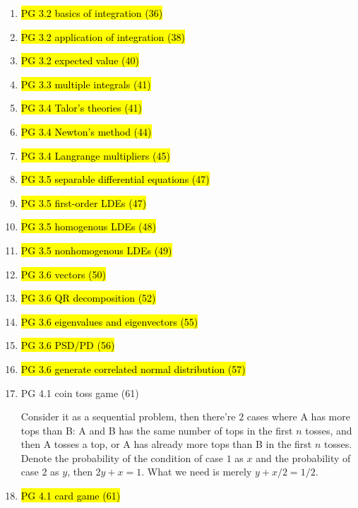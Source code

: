 \documentclass[11pt]{article}
\newenvironment{note}{\begin{enumerate}[leftmargin=1em,topsep=0pt,noitemsep]}{\end{enumerate}}
\newcommand{\solution}{\boxed{\textbf{SOLUTION}}\hspace{.5em}}
\begin{document}
\begin{spacing}{1.1}
\begin{note}
\item \hl{PG 3.2 basics of integration (36)}

\item \hl{PG 3.2 application of integration (38)}

\item \hl{PG 3.2 expected value (40)}

\item \hl{PG 3.3 multiple integrals (41)}

\item \hl{PG 3.4 Talor's theories (41)}

\item \hl{PG 3.4 Newton's method (44)}

\item \hl{PG 3.4 Langrange multipliers (45)}

\item \hl{PG 3.5 separable differential equations (47)}

\item \hl{PG 3.5 first-order LDEs (47)}

\item \hl{PG 3.5 homogenous LDEs (48)}

\item \hl{PG 3.5 nonhomogenous LDEs (49)}

\item \hl{PG 3.6 vectors (50)}

\item \hl{PG 3.6 QR decomposition (52)}

\item \hl{PG 3.6 eigenvalues and eigenvectors (55)}

\item \hl{PG 3.6 PSD/PD (56)}

\item \hl{PG 3.6 generate correlated normal distribution (57)}

\item PG 4.1 coin toss game (61)

\solution Consider it as a sequential problem, then there're $2$ cases where A has more tops than B: A and B has the same number of tops in the first $n$ tosses, and then A tosses a top, or A has already more tops than B in the first $n$ tosses. Denote the probability of the condition of case $1$ as $x$ and the probability of case $2$ as $y$, then $2y + x = 1$. What we need is merely $y+x/2 = 1/2$.

\item \hl{PG 4.1 card game (61)}


\end{note}
\end{spacing}
\end{document}
